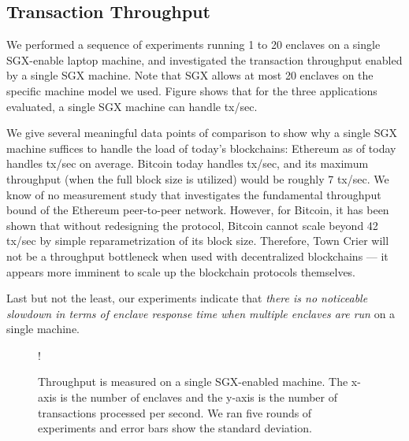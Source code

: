 \subsection{Transaction Throughput}
We performed a sequence of experiments running 1 to 20 enclaves 
on a single SGX-enable laptop
machine, and investigated the transaction throughput 
enabled by a single SGX machine. 
Note that SGX allows at most 20 enclaves on the specific machine model we used.
Figure  
shows that for the three applications evaluated,
a single SGX machine can handle
tx/sec.

We give several meaningful data points of comparison to show
why a single SGX machine suffices to handle the load of
today's blockchains: 
Ethereum as of today handles 
 tx/sec on average. 
Bitcoin today handles
 tx/sec, and 
its maximum throughput (when the full block size is utilized)
would be roughly 7 tx/sec.
We know of no measurement study that 
investigates the fundamental 
throughput bound of the Ethereum  peer-to-peer network.
However, for Bitcoin, it has been shown that without
redesigning the protocol, 
Bitcoin cannot scale beyond  
42 tx/sec  by simple reparametrization of its block size.
Therefore, Town Crier will not be a throughput 
bottleneck when used 
with decentralized blockchains --- it appears 
more imminent to scale up 
the blockchain protocols themselves.

Last but not the least, our experiments indicate
that {\it there is no noticeable slowdown in terms of enclave
response time when multiple enclaves are run} on a single machine.

\begin{figure}[h]
  \resizebox {\columnwidth} {!}{
}
\caption{Throughput is measured on a single SGX-enabled machine. The x-axis is
the number of enclaves and the y-axis is the number of transactions processed per
second.  We ran five rounds of experiments and error bars show the standard
deviation.}
\end{figure}


